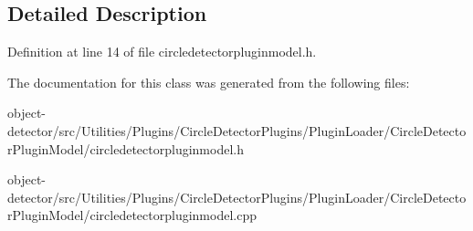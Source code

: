 \subsection{Detailed Description}


Definition at line 14 of file circledetectorpluginmodel.\+h.



The documentation for this class was generated from the following files\+:\begin{DoxyCompactItemize}
\item 
object-\/detector/src/\+Utilities/\+Plugins/\+Circle\+Detector\+Plugins/\+Plugin\+Loader/\+Circle\+Detector\+Plugin\+Model/circledetectorpluginmodel.\+h\item 
object-\/detector/src/\+Utilities/\+Plugins/\+Circle\+Detector\+Plugins/\+Plugin\+Loader/\+Circle\+Detector\+Plugin\+Model/circledetectorpluginmodel.\+cpp\end{DoxyCompactItemize}
